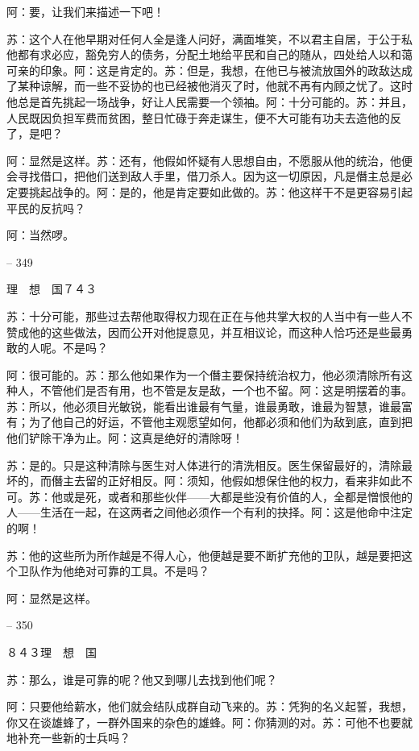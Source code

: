 \documentclass[11pt,oneside]{book}
\begin{document}
\begin{common-format}
    阿：要，让我们来描述一下吧！

    苏：这个人在他早期对任何人全是逢人问好，满面堆笑，不以君主自居，于公于私他都有求必应，豁免穷人的债务，分配土地给平民和自己的随从，四处给人以和蔼可亲的印象。阿：这是肯定的。苏：但是，我想，在他已与被流放国外的政敌达成了某种谅解，而一些不妥协的也已经被他消灭了时，他就不再有内顾之忧了。这时他总是首先挑起一场战争，好让人民需要一个领袖。阿：十分可能的。苏：并且，人民既因负担军费而贫困，整日忙碌于奔走谋生，便不大可能有功夫去造他的反了，是吧？

    阿：显然是这样。苏：还有，他假如怀疑有人思想自由，不愿服从他的统治，他便会寻找借口，把他们送到敌人手里，借刀杀人。因为这一切原因，凡是僭主总是必定要挑起战争的。阿：是的，他是肯定要如此做的。苏：他这样干不是更容易引起平民的反抗吗？

    阿：当然啰。

    

-- 349

    理　想　国７４３

    苏：十分可能，那些过去帮他取得权力现在正在与他共掌大权的人当中有一些人不赞成他的这些做法，因而公开对他提意见，并互相议论，而这种人恰巧还是些最勇敢的人呢。不是吗？

    阿：很可能的。苏：那么他如果作为一个僭主要保持统治权力，他必须清除所有这种人，不管他们是否有用，也不管是友是敌，一个也不留。阿：这是明摆着的事。苏：所以，他必须目光敏锐，能看出谁最有气量，谁最勇敢，谁最为智慧，谁最富有；为了他自己的好运，不管他主观愿望如何，他都必须和他们为敌到底，直到把他们铲除干净为止。阿：这真是绝好的清除呀！

    苏：是的。只是这种清除与医生对人体进行的清洗相反。医生保留最好的，清除最坏的，而僭主去留的正好相反。阿：须知，他假如想保住他的权力，看来非如此不可。苏：他或是死，或者和那些伙伴——大都是些没有价值的人，全都是憎恨他的人——生活在一起，在这两者之间他必须作一个有利的抉择。阿：这是他命中注定的啊！

    苏：他的这些所为所作越是不得人心，他便越是要不断扩充他的卫队，越是要把这个卫队作为他绝对可靠的工具。不是吗？

    阿：显然是这样。

    

-- 350

    ８４３理　想　国

    苏：那么，谁是可靠的呢？他又到哪儿去找到他们呢？

    阿：只要他给薪水，他们就会结队成群自动飞来的。苏：凭狗的名义起誓，我想，你又在谈雄蜂了，一群外国来的杂色的雄蜂。阿：你猜测的对。苏：可他不也要就地补充一些新的士兵吗？


\end{common-format}
\end{document}
